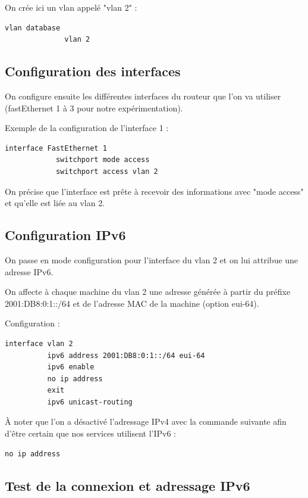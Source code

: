     	On crée ici un vlan appelé "vlan 2" :
        \begin{lstlisting}[frame=single]
              vlan database
              vlan 2
        \end{lstlisting}
\newpage
	\subsection{Configuration des interfaces}
        	
		On configure ensuite les différentes interfaces du routeur que l'on va utiliser (fastEthernet 1 à 3 pour notre expérimentation). 
    
Exemple de la configuration de l'interface 1 :
        \begin{lstlisting}[frame=single]
            interface FastEthernet 1
            switchport mode access
            switchport access vlan 2
        \end{lstlisting}
    
    On précise que l'interface est prête à recevoir des informations avec "mode access" et qu'elle est liée au vlan 2.
    
	\subsection{Configuration IPv6}
        
        On passe en mode configuration pour l'interface du vlan 2 et on lui attribue une adresse IPv6. 
        
        On affecte à chaque machine du vlan 2 une adresse générée à partir du préfixe 2001:DB8:0:1::/64 et de l'adresse MAC de la machine (option eui-64).
        
        Configuration :
        \begin{lstlisting}[frame=single]
          interface vlan 2
          ipv6 address 2001:DB8:0:1::/64 eui-64
          ipv6 enable
          no ip address
          exit
          ipv6 unicast-routing 
        \end{lstlisting}
        
        À noter que l'on a désactivé l'adressage IPv4 avec la commande suivante afin d'être certain que nos services utilisent l'IPv6 :
        \begin{lstlisting}[frame=single]
			no ip address
        \end{lstlisting}
        
	\subsection{Test de la connexion et adressage IPv6}
        
